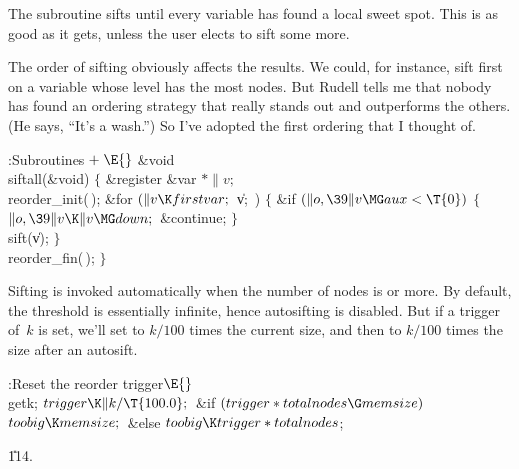 The  subroutine sifts until every variable has found
a local sweet spot. This is as good as it gets, unless the user elects
to sift some more.

The order of sifting obviously affects the results. We could, for instance,
sift first on a variable whose level has the most nodes. But Rudell tells me
that nobody has found an ordering strategy that really stands out
and outperforms the others. (He says, ``It's a wash.'') So I've adopted
the first ordering that I thought of.

\Y\B\4:Subroutines\X${}\mathrel+\E{}$\6
\&{void} \\{siftall}(\&{void})\1\1\2\2\6
${}\{{}$\1\6
\&{register} \&{var} ${}{*}\|v;{}$\7
\\{reorder\_init}(\,);\6
\&{for} ${}(\|v\K\\{firstvar};{}$ \|v; \,)\5
${}\{{}$\1\6
\&{if} ${}(\|o,\39\|v\MG\\{aux}<\T{0}){}$\5
${}\{{}$\1\6
${}\|o,\39\|v\K\|v\MG\\{down};{}$\6
\&{continue};\6
\4${}\}{}$\2\6
\\{sift}(\|v);\6
\4${}\}{}$\2\6
\\{reorder\_fin}(\,);\6
\4${}\}{}$\2\par
\fi

Sifting is invoked automatically when the number of nodes is
 or more. By default, the  threshold is
essentially
infinite, hence autosifting is disabled. But if a trigger of~$k$
is set, we'll set  to $k/100$ times the current size,
and then to $k/100$ times the size after an autosift.

\Y\B\4:Reset the reorder trigger\X${}\E{}$\6
\\{getk};\6
${}\\{trigger}\K\|k/\T{100.0};{}$\6
\&{if} ${}(\\{trigger}*\\{totalnodes}\G\\{memsize}){}$\1\5
${}\\{toobig}\K\\{memsize};{}$\2\6
\&{else}\1\5
${}\\{toobig}\K\\{trigger}*\\{totalnodes}{}$;\2\par
\U114.\fi

